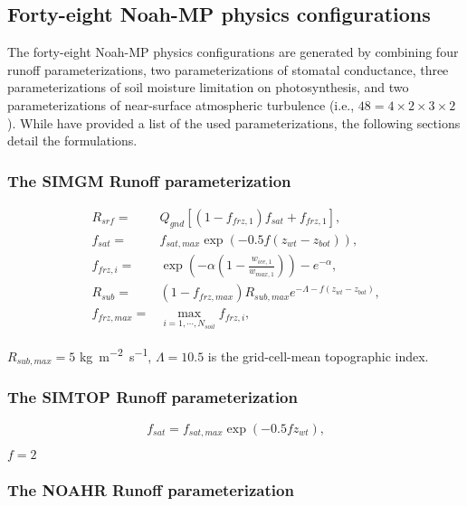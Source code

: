 \documentclass[essd]{copernicus}
\begin{document}
\subsection{Forty-eight Noah-MP physics configurations} \label{sec:data:noahmp}

The forty-eight Noah-MP physics configurations are generated by combining four
runoff parameterizations, two parameterizations of stomatal conductance, three
parameterizations of soil moisture limitation on photosynthesis, and two
parameterizations of near-surface atmospheric turbulence (i.e., $48 = 4 \times 2
\times 3 \times 2$). While \citet[Table 1]{zheng2019WRR} have provided a list of
the used parameterizations, the following sections detail the formulations.

\subsubsection{The SIMGM Runoff parameterization}

\begin{align}
    R_{srf} = & Q_{gnd} [(1 - f_{frz,1}) f_{sat} + f_{frz,1} ] \text{,} \\
    f_{sat} = & f_{sat,max} \exp(-0.5 f (z_{wt} - z_{bot})) \text{,} \\
    f_{frz,i} = & \exp\left(-\alpha(1 - \frac{w_{ice,1}}{w_{max,1}})\right) - e^{-\alpha} \text{,} \\
    R_{sub} = & (1 - f_{frz,max}) R_{sub,max} e^{-\Lambda - f(z_{wt} - z_{bot})} \text{,} \\
    f_{frz,max} = & \max_{i=1,\cdots,N_{soil}} f_{frz,i} \text{,}
\end{align}

$R_{sub,max} = 5$ \unit{kg~m^{-2}~s^{-1}}, $\Lambda = 10.5$ is the
grid-cell-mean topographic index.


\subsubsection{The SIMTOP Runoff parameterization}

\begin{equation}
    f_{sat} = f_{sat,max} \exp(-0.5 f z_{wt}) \text{,}
\end{equation}

$f=2$


\subsubsection{The NOAHR Runoff parameterization}
\end{document}
